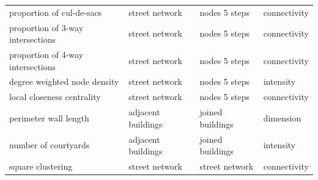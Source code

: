 \begin{longtable}{p{5cm}p{4cm}p{4cm}l}
           proportion of cul-de-sacs &                  street network &              nodes 5 steps & connectivity \\
   proportion of 3-way intersections &                  street network &              nodes 5 steps & connectivity \\
   proportion of 4-way intersections &                  street network &              nodes 5 steps & connectivity \\
        degree weighted node density &                  street network &              nodes 5 steps &    intensity \\
          local closeness centrality &                  street network &              nodes 5 steps & connectivity \\
               perimeter wall length &             adjacent buildings  &           joined buildings &    dimension \\
                number of courtyards &             adjacent buildings  &           joined buildings &    intensity \\
                   square clustering &                  street network &             street network & connectivity \\
\end{longtable}


